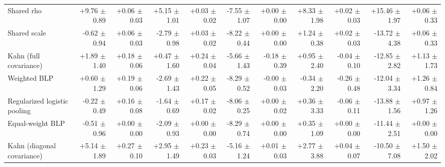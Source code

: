 \begin{tabular}{lrrrrrrrrrr}
Shared rho & +9.76 {\scriptsize $\pm$ 0.89} & +0.06 {\scriptsize $\pm$ 0.03} & +5.15 {\scriptsize $\pm$ 1.01} & +0.03 {\scriptsize $\pm$ 0.02} & -7.55 {\scriptsize $\pm$ 1.07} & +0.00 {\scriptsize $\pm$ 0.00} & +8.33 {\scriptsize $\pm$ 1.98} & +0.02 {\scriptsize $\pm$ 0.03} & +15.46 {\scriptsize $\pm$ 1.97} & +0.06 {\scriptsize $\pm$ 0.33} \\
Shared scale & -0.62 {\scriptsize $\pm$ 0.94} & +0.06 {\scriptsize $\pm$ 0.03} & -2.79 {\scriptsize $\pm$ 0.98} & +0.03 {\scriptsize $\pm$ 0.02} & -8.22 {\scriptsize $\pm$ 0.44} & +0.00 {\scriptsize $\pm$ 0.00} & +1.24 {\scriptsize $\pm$ 0.38} & +0.02 {\scriptsize $\pm$ 0.03} & -13.72 {\scriptsize $\pm$ 4.38} & +0.06 {\scriptsize $\pm$ 0.33} \\
Kahn (full covariance) & +1.89 {\scriptsize $\pm$ 1.40} & +0.18 {\scriptsize $\pm$ 0.06} & +0.47 {\scriptsize $\pm$ 1.60} & +0.24 {\scriptsize $\pm$ 0.04} & -5.66 {\scriptsize $\pm$ 1.43} & -0.18 {\scriptsize $\pm$ 0.39} & +0.95 {\scriptsize $\pm$ 2.40} & -0.04 {\scriptsize $\pm$ 0.10} & -12.85 {\scriptsize $\pm$ 2.82} & +1.13 {\scriptsize $\pm$ 1.73} \\
Weighted BLP & +0.60 {\scriptsize $\pm$ 1.29} & +0.19 {\scriptsize $\pm$ 0.06} & -2.69 {\scriptsize $\pm$ 1.43} & +0.22 {\scriptsize $\pm$ 0.05} & -8.29 {\scriptsize $\pm$ 0.52} & -0.00 {\scriptsize $\pm$ 0.03} & -0.34 {\scriptsize $\pm$ 2.20} & -0.26 {\scriptsize $\pm$ 0.48} & -12.04 {\scriptsize $\pm$ 3.34} & +1.26 {\scriptsize $\pm$ 0.84} \\
Regularized logistic pooling & -0.22 {\scriptsize $\pm$ 0.49} & +0.16 {\scriptsize $\pm$ 0.08} & -1.64 {\scriptsize $\pm$ 0.69} & +0.17 {\scriptsize $\pm$ 0.02} & -8.06 {\scriptsize $\pm$ 0.25} & +0.00 {\scriptsize $\pm$ 0.02} & +0.36 {\scriptsize $\pm$ 3.33} & -0.06 {\scriptsize $\pm$ 0.11} & -13.88 {\scriptsize $\pm$ 1.56} & +0.97 {\scriptsize $\pm$ 1.26} \\
Equal-weight BLP & -0.51 {\scriptsize $\pm$ 0.96} & +0.00 {\scriptsize $\pm$ 0.00} & -2.09 {\scriptsize $\pm$ 0.93} & +0.00 {\scriptsize $\pm$ 0.00} & -8.29 {\scriptsize $\pm$ 0.74} & +0.00 {\scriptsize $\pm$ 0.00} & +0.35 {\scriptsize $\pm$ 1.09} & +0.00 {\scriptsize $\pm$ 0.00} & -11.44 {\scriptsize $\pm$ 2.51} & +0.00 {\scriptsize $\pm$ 0.00} \\
Kahn (diagonal covariance) & +5.14 {\scriptsize $\pm$ 1.89} & +0.27 {\scriptsize $\pm$ 0.10} & +2.95 {\scriptsize $\pm$ 1.49} & +0.23 {\scriptsize $\pm$ 0.03} & -5.16 {\scriptsize $\pm$ 1.24} & +0.01 {\scriptsize $\pm$ 0.03} & +2.77 {\scriptsize $\pm$ 3.88} & +0.04 {\scriptsize $\pm$ 0.07} & -10.50 {\scriptsize $\pm$ 7.08} & +1.50 {\scriptsize $\pm$ 2.02} \\

\end{tabular}
